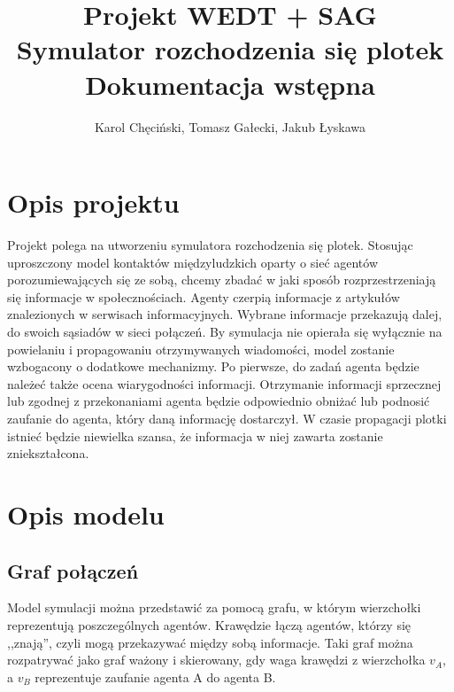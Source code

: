 \documentclass{article}
\title{Projekt WEDT + SAG \\ Symulator rozchodzenia się plotek \\ Dokumentacja wstępna}
\author{Karol Chęciński, Tomasz Gałecki, Jakub Łyskawa}
\begin{document}
	\maketitle
	\section{Opis projektu}
		Projekt polega na utworzeniu symulatora rozchodzenia się plotek. Stosując uproszczony model kontaktów międzyludzkich oparty o sieć agentów porozumiewających się ze sobą, chcemy zbadać w jaki sposób rozprzestrzeniają się informacje w społecznościach. Agenty czerpią informacje z artykułów znalezionych w serwisach informacyjnych. Wybrane informacje przekazują dalej, do swoich sąsiadów w sieci połączeń. 
		By symulacja nie opierała się wyłącznie na powielaniu i propagowaniu otrzymywanych wiadomości, model zostanie wzbogacony o dodatkowe mechanizmy. Po pierwsze, do zadań agenta będzie należeć także ocena wiarygodności informacji. Otrzymanie informacji sprzecznej lub zgodnej z przekonaniami agenta będzie odpowiednio obniżać lub podnosić zaufanie do agenta, który daną informację dostarczył. W czasie propagacji plotki istnieć będzie niewielka szansa, że informacja w niej zawarta zostanie zniekształcona. 
	\section{Opis modelu}
	\subsection{Graf połączeń}
		Model symulacji można przedstawić za pomocą grafu, w którym wierzchołki reprezentują poszczególnych agentów. Krawędzie łączą agentów, którzy się ,,znają'', czyli mogą przekazywać między sobą informacje. Taki graf można rozpatrywać jako graf ważony i skierowany, gdy waga krawędzi z wierzchołka $v_A$, a $v_B$ reprezentuje zaufanie agenta A do agenta B.

\end{document}
